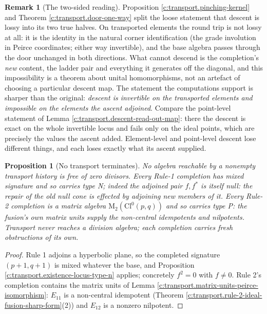 \documentclass[11pt]{article}
\newtheorem{proposition}[theorem]{Proposition}
\theoremstyle{definition}
\newtheorem{remark}[theorem]{Remark}
\theoremstyle{plain}
\providecommand{\Cl}{}\renewcommand{\Cl}{\mathrm{Cl}}
\providecommand{\Mat}{}\renewcommand{\Mat}{\mathrm{M}}
\begin{document}
\begin{remark}[The two-sided reading]\label{c:note.transport.two-sided-reading}
Proposition \ref{c:transport.pinching-kernel} and Theorem \ref{c:transport.door-one-way} split the loose statement that descent is lossy into its two true halves. On transported elements the round trip is not lossy at all: it is the identity in the natural corner identification (the grade involution in Peirce coordinates; either way invertible), and the base algebra passes through the door unchanged in both directions. What cannot descend is the completion's \emph{new} content, the ladder pair and everything it generates off the diagonal, and this impossibility is a theorem about unital homomorphisms, not an artefact of choosing a particular descent map. The statement the computations support is sharper than the original: \emph{descent is invertible on the transported elements and impossible on the elements the ascent adjoined}. Compare the point-level statement of Lemma \ref{c:transport.descent-read-out-map}: there the descent is exact on the whole invertible locus and fails only on the ideal points, which are precisely the values the ascent added. Element-level and point-level descent lose different things, and each loses exactly what its ascent supplied.
\end{remark}

\begin{proposition}[No transport terminates]\label{c:transport.no-transport-terminates}
No algebra reachable by a nonempty transport history is free of zero divisors. Every Rule-1 completion has mixed signature and so carries type N; indeed the adjoined pair $f, f^*$ is itself null: the repair of the old null cone is effected by adjoining new members of it. Every Rule-2 completion is a matrix algebra $\Mat_2(\Cl^0(p,q))$ and so carries type P: the fusion's own matrix units supply the non-central idempotents and nilpotents. Transport never reaches a division algebra; each completion carries fresh obstructions of its own.
\end{proposition}
\begin{proof}
Rule 1 adjoins a hyperbolic plane, so the completed signature $(p{+}1, q{+}1)$ is mixed whatever the base, and Proposition \ref{c:transport.existence-locus-type-n} applies; concretely $f^2 = 0$ with $f \neq 0$. Rule 2's completion contains the matrix units of Lemma \ref{c:transport.matrix-units-peirce-isomorphism}: $E_{11}$ is a non-central idempotent (Theorem \ref{c:transport.rule-2-ideal-fusion-sharp-form}(2)) and $E_{12}$ is a nonzero nilpotent.

\end{proof}
\end{document}
